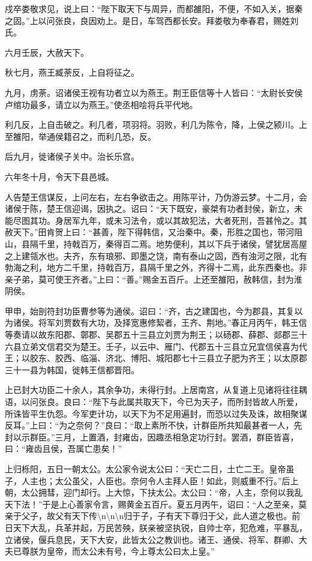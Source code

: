 \documentclass[]{article}
\begin{document}
戍卒娄敬求见，说上曰：``陛下取天下与周异，而都雒阳，不便，不如入关，据秦之固。''上以问张良，良因劝上。是日，车驾西都长安。拜娄敬为奉春君，赐姓刘氏。

六月壬辰，大赦天下。

秋七月，燕王臧荼反，上自将征之。

九月，虏荼。诏诸侯王视有功者立以为燕王。荆王臣信等十人皆曰：``太尉长安侯卢绾功最多，请立以为燕王。''使丞相哙将兵平代地。

利几反，上自击破之。利几者，项羽将。羽败，利几为陈令，降，上侯之颍川。上至雒阳，举通侯籍召之，而利几恐，反。

后九月，徙诸侯子关中。治长乐宫。

六年冬十月，令天下县邑城。

人告楚王信谋反，上问左右，左右争欲击之。用陈平计，乃伪游云梦。十二月，会诸侯于陈，楚王信迎谒，因执之。诏曰：``天下既安，豪桀有功者封侯，新立，未能尽图其功。身居军九年，或未习法令，或以其故犯法，大者死刑，吾甚怜之。其赦天下。''田肯贺上曰：``甚善，陛下得韩信，又治秦中。秦，形胜之国也，带河阻山，县隔千里，持戟百万，秦得百二焉。地势便利，其以下兵于诸侯，譬犹居高屋之上建瓴水也。夫齐，东有琅邪、即墨之饶，南有泰山之固，西有浊河之限，北有勃海之利，地方二千里，持戟百万，县隔千里之外，齐得十二焉，此东西秦也。非亲子弟，莫可使王齐者。''上曰：``善。''赐金五百斤。上还至雒阳，赦韩信，封为淮阴侯。

甲申，始剖符封功臣曹参等为通侯。诏曰：``齐，古之建国也，今为郡县，其复以为诸侯。将军刘贾数有大功，及择宽惠修絜者，王齐、荆地。''春正月丙午，韩王信等奏请以故东阳郡、鄣郡、吴郡五十三县立刘贾为荆王；以砀郡、薛郡、郯郡三十六县立弟文信君交为楚王。壬子，以云中、雁门、代郡五十三县立兄宜信侯喜为代王；以胶东、胶西、临淄、济北、博阳、城阳郡七十三县立子肥为齐王；以太原郡三十一县为韩国，徙韩王信都晋阳。

上已封大功臣二十余人，其余争功，未得行封。上居南宫，从复道上见诸将往往耦语，以问张良。良曰：``陛下与此属共取天下，今已为天子，而所封皆故人所爱，所诛皆平生仇怨。今军吏计功，以天下为不足用遍封，而恐以过失及诛，故相聚谋反耳。''上曰：``为之奈何？''良曰：``取上素所不快，计群臣所共知最甚者一人，先封以示群臣。''三月，上置酒，封雍齿，因趣丞相急定功行封。罢酒，群臣皆喜，曰：``雍齿且侯，吾属亡患矣！''

上归栎阳，五日一朝太公。太公家令说太公曰：``天亡二日，土亡二王。皇帝虽子，人主也；太公虽父，人臣也。奈何令人主拜人臣！如此，则威重不行。''后上朝，太公拥彗，迎门却行。上大惊，下扶太公。太公曰：``帝，人主，奈何以我乱天下法！''于是上心善家令言，赐黄金五百斤。夏五月丙午，诏曰：``人之至亲，莫亲于父子，故父有天下传\textbackslash{}n\textbackslash{}n\textbackslash{}n归于子，子有天下尊归于父，此人道之极也。前日天下大乱，兵革并起，万民苦殃，朕亲被坚执锐，自帅士卒，犯危难，平暴乱，立诸侯，偃兵息民，天下大安，此皆太公之教训也。诸王、通侯、将军、群卿、大夫已尊朕为皇帝，而太公未有号，今上尊太公曰太上皇。''
\end{document}
